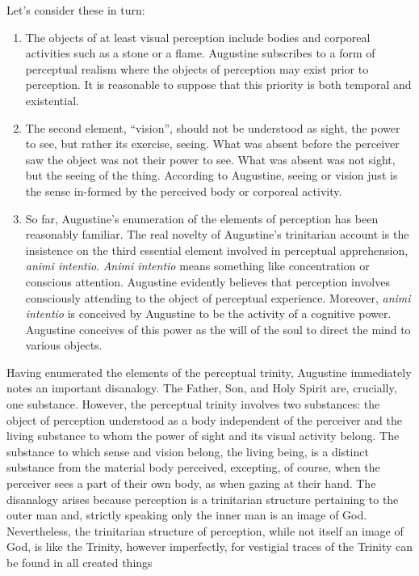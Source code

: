 \documentclass[12pt]{article}
\begin{document}
Let's consider these in turn:
\begin{enumerate}[(1)]
	\item The objects of at least visual perception include bodies and corporeal activities such as a stone or a flame. Augustine subscribes to a form of perceptual realism where the objects of perception may exist prior to perception. It is reasonable to suppose that this priority is both temporal and existential.
	\item The second element, ``vision'', should not be understood as sight, the power to see, but rather its exercise, seeing. What was absent before the perceiver saw the object was not their power to see. What was absent was not sight, but the seeing of the thing. According to Augustine, seeing or vision just is the sense in-formed by the perceived body or corporeal activity.
	\item So far, Augustine's enumeration of the elements of perception has been reasonably familiar. The real novelty of Augustine's trinitarian account is the insistence on the third essential element involved in perceptual apprehension, \emph{animi intentio}. \emph{Animi intentio} means something like concentration or conscious attention. Augustine evidently believes that perception involves consciously attending to the object of perceptual experience. Moreover, \emph{animi intentio} is conceived by Augustine to be the activity of a cognitive power. Augustine conceives of this power as the will of the soul to direct the mind to various objects.
\end{enumerate}

Having enumerated the elements of the perceptual trinity, Augustine immediately notes an important disanalogy. The Father, Son, and Holy Spirit are, crucially, one substance. However, the perceptual trinity involves two substances: the object of perception understood as a body independent of the perceiver and the living substance to whom the power of sight and its visual activity belong. The substance to which sense and vision belong, the living being, is a distinct substance from the material body perceived, excepting, of course, when the perceiver sees a part of their own body, as when gazing at their hand. The disanalogy arises because perception is a trinitarian structure pertaining to the outer man and, strictly speaking only the inner man is an image of God. Nevertheless, the trinitarian structure of perception, while not itself an image of God, is like the Trinity, however imperfectly, for vestigial traces of the Trinity can be found in all created things
\end{document}
